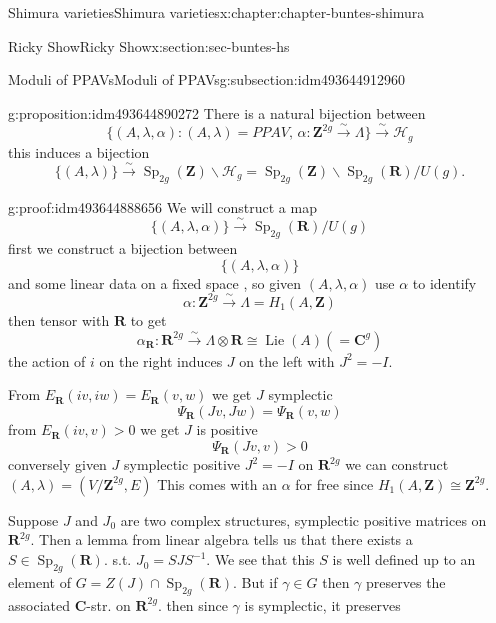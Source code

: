 \documentclass[oneside,10pt,]{book}
\numberwithin{equation}{section}
\DeclareMathOperator{\Lie}{Lie}
\newcommand{\inv}{^{-1}}
\newcommand{\ZZ}{\mathbf{Z}}
\newcommand{\RR}{\mathbf{R}}
\newcommand{\CC}{\mathbf{C}}
\DeclareMathOperator{\Sp}{Sp}
\newcommand{\gt}{>}
\begin{document}
\begin{chapterptx}{Shimura varieties}{}{Shimura varieties}{}{}{x:chapter:chapter-buntes-shimura}
\begin{sectionptx}{Ricky Show}{}{Ricky Show}{}{}{x:section:sec-buntes-hs}
\begin{subsectionptx}{Moduli of PPAVs}{}{Moduli of PPAVs}{}{}{g:subsection:idm493644912960}
\begin{proposition}{}{}{g:proposition:idm493644890272}%
There is a natural bijection between%
\begin{equation*}
\{(A,\lambda, \alpha) : (A,\lambda)= PPAV,\,\alpha\colon \ZZ^{2g} \xrightarrow \sim \Lambda\} \xrightarrow\sim \mathscr H_g
\end{equation*}
this induces a  bijection%
\begin{equation*}
\{(A,\lambda) \} \xrightarrow \sim \Sp_{2g}(\ZZ) \backslash \mathscr H_g = \Sp_{2g}(\ZZ) \backslash \Sp_{2g} (\RR) / U(g)\text{.}
\end{equation*}
%
\end{proposition}
\begin{proofptx}{}{g:proof:idm493644888656}
We will construct a map%
\begin{equation*}
\{(A,\lambda ,\alpha)\} \xrightarrow\sim\Sp_{2g} (\RR)/U(g)
\end{equation*}
first we construct  a bijection between%
\begin{equation*}
\{(A,\lambda, \alpha)\}
\end{equation*}
and some linear data on a fixed space , so given \((A, \lambda, \alpha)\) use \(\alpha\) to identify%
\begin{equation*}
\alpha\colon \ZZ^{2g} \xrightarrow \sim \Lambda = H_1(A,\ZZ)
\end{equation*}
then  tensor with \(\RR\) to get%
\begin{equation*}
\alpha_\RR \colon \RR^{2g} \xrightarrow\sim \Lambda\otimes \RR \cong \Lie(A) (= \CC^g)
\end{equation*}
the action of \(i\) on the right induces \(J\) on the left with \(J^2 = -I\).%
\par
From \(E_\RR(iv,iw) = E_\RR(v,w)\) we get \(J \) symplectic%
\begin{equation*}
\Psi_\RR(Jv, Jw) = \Psi_\RR( v,w)
\end{equation*}
from \(E_\RR(iv,v) \gt 0\) we get \(J\) is positive%
\begin{equation*}
\Psi_\RR(Jv,v) \gt 0
\end{equation*}
conversely given \(J\) symplectic positive \(J^2 = -I\) on \(\RR^{2g}\) we can construct \((A,\lambda) = (V/\ZZ^{2g}, E)\) This comes with an \(\alpha\) for free since \(H_1(A, \ZZ) \cong \ZZ^{2g}\).%
\par
Suppose \(J\) and \(J_0\) are two complex structures, symplectic positive matrices on \(\RR^{2g}\). Then a lemma from linear algebra tells us that there exists a \(S \in \Sp_{2g}(\RR)\). s.t. \(J_0  = S J S \inv\). We see that this \(S\) is well defined up to an element of \(G = Z(J) \cap \Sp_{2g}(\RR)\). But if \(\gamma \in G \) then \(\gamma\) preserves the associated \(\CC\)-str. on \(\RR^{2g}\). then since \(\gamma\) is symplectic, it preserves%

\end{proofptx}
\end{subsectionptx}
\end{sectionptx}
\end{chapterptx}
\end{document}
